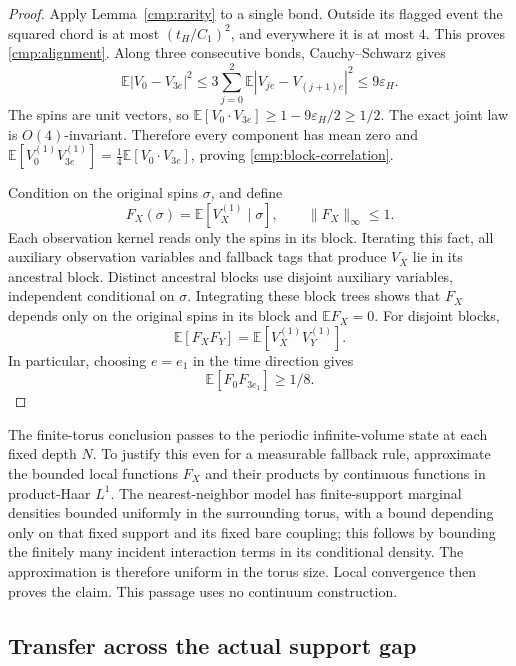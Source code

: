 \begin{proof}
Apply Lemma~\ref{cmp:rarity} to a single bond. Outside its flagged
event the squared chord is at most $(t_H/C_1)^2$, and everywhere
it is at most $4$. This proves \eqref{cmp:alignment}.
Along three consecutive bonds, Cauchy--Schwarz gives
\[
 \mathbb E|V_0-V_{3e}|^2
 \le3\sum_{j=0}^2
       \mathbb E|V_{je}-V_{(j+1)e}|^2
 \le9\varepsilon_H.
\]
The spins are unit vectors, so
$\mathbb E[V_0\cdot V_{3e}]\ge1-9\varepsilon_H/2\ge1/2$.
The exact joint law is $O(4)$-invariant. Therefore every component
has mean zero and
$\mathbb E[V_0^{(1)}V_{3e}^{(1)}]
      =\frac14\mathbb E[V_0\cdot V_{3e}]$, proving
\eqref{cmp:block-correlation}.

Condition on the original spins $\sigma$, and define
\begin{equation}
\label{eq:block-observable}
 F_X(\sigma)=\mathbb E[V_X^{(1)}\mid\sigma],\qquad
 \|F_X\|_\infty\le1.
\end{equation}
Each observation kernel reads only the spins in its block. Iterating
this fact, all auxiliary observation variables and fallback tags that
produce $V_X$ lie in its ancestral block. Distinct ancestral blocks
use disjoint auxiliary variables, independent conditional on $\sigma$.
Integrating these block trees shows that $F_X$ depends only on the
original spins in its block and $\mathbb E F_X=0$. For disjoint blocks,
\[
 \mathbb E[F_XF_Y]=\mathbb E[V_X^{(1)}V_Y^{(1)}].
\]
In particular, choosing $e=e_1$ in the time direction gives
\begin{equation}
\label{eq:block-correlation}
 \mathbb E[F_0F_{3e_1}]\ge1/8.
\end{equation}
\end{proof}

The finite-torus conclusion passes to the periodic infinite-volume
state at each fixed depth $N$. To justify this even for a measurable
fallback rule, approximate the bounded local functions $F_X$ and
their products by continuous functions in product-Haar $L^1$.
The nearest-neighbor model has finite-support marginal densities
bounded uniformly in the surrounding torus, with a bound depending
only on that fixed support and its fixed bare coupling; this follows
by bounding the finitely many incident interaction terms in its
conditional density. The approximation is therefore uniform in the
torus size. Local convergence then proves the claim. This passage
uses no continuum construction.

\subsection{Transfer across the actual support gap}

